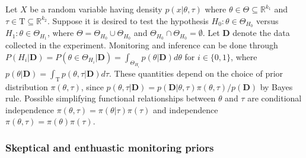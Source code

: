 \documentclass[12pt]{article}
\begin{document}
Let $X$ be a random variable having density $p(x|\theta,\tau)$ where $\theta\in\Theta\subseteq\mathbb{R}^{k_1}$ and $\tau\in\mathrm{T}\subseteq\mathbb{R}^{k_2}$. Suppose it is desired to test the hypothesis $H_0:\theta\in\Theta_{H_0}$ versus $H_1:\theta\in\Theta_{H_1}$, where $\Theta=\Theta_{H_0}\cup \Theta_{H_0}$ and $\Theta_{H_0}\cap \Theta_{H_0}=\emptyset$. Let $\mathbf{D}$ denote the data collected in the experiment. Monitoring and inference can be done through $P(H_i|\mathbf{D})=P(\theta\in\Theta_{H_i}|\mathbf{D})=\int_{\Theta_{H_i}}p(\theta|\mathbf{D})d\theta$ for $i\in\{0,1\}$, where $p(\theta|\mathbf{D})=\int_{\mathrm{T}}p(\theta,\tau|\mathbf{D})d\tau$. These quantities depend on the choice of prior distribution $\pi(\theta,\tau)$, since $p(\theta,\tau|\mathbf{D})=p(\mathbf{D}|\theta,\tau)\pi(\theta,\tau)/p(\mathbf{D})$ by Bayes rule. Possible simplifying functional relationships between $\theta$ and $\tau$ are conditional independence $\pi(\theta,\tau)=\pi(\theta|\tau)\pi(\tau)$ and independence $\pi(\theta,\tau)=\pi(\theta)\pi(\tau)$.%

\subsubsection{Skeptical and enthuastic monitoring priors}
\end{document}
